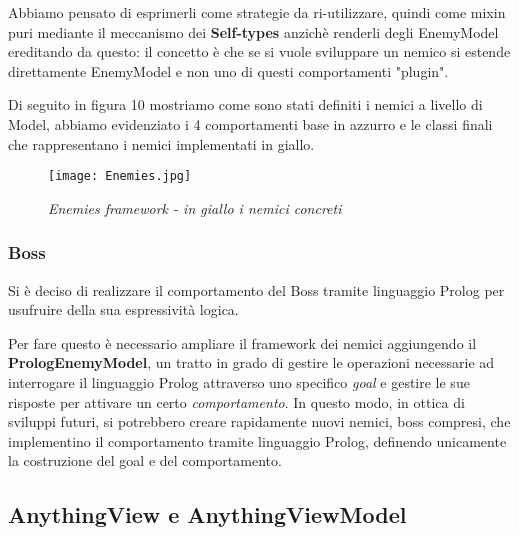Abbiamo pensato di esprimerli come strategie da ri-utilizzare, quindi come mixin puri mediante il meccanismo dei \textbf{Self-types} anzichè renderli degli EnemyModel ereditando da questo: il concetto è che se si vuole sviluppare un nemico si estende direttamente EnemyModel e non uno di questi comportamenti "plugin".

Di seguito in figura 10 mostriamo come sono stati definiti i nemici a livello di Model, abbiamo evidenziato i 4 comportamenti base in azzurro e le classi finali che rappresentano i nemici implementati in giallo.

\begin{figure}[!hbt]
    \centering
    \texttt{[image: Enemies.jpg]}
    \caption{\textit{Enemies framework - in giallo i nemici concreti}}
\end{figure}

\subsubsection{Boss}

Si è deciso di realizzare il comportamento del Boss tramite linguaggio Prolog per usufruire della sua espressività logica.

Per fare questo è necessario ampliare il framework dei nemici aggiungendo il \textbf{PrologEnemyModel}, 
un tratto in grado di gestire le operazioni necessarie ad interrogare il linguaggio Prolog attraverso uno specifico \textit{goal} 
e gestire le sue risposte per attivare un certo \textit{comportamento}.
In questo modo, in ottica di sviluppi futuri, si potrebbero creare rapidamente nuovi nemici, boss compresi, che implementino il comportamento tramite linguaggio Prolog, definendo unicamente la costruzione del goal e del comportamento.

\subsection{AnythingView e AnythingViewModel}
 
